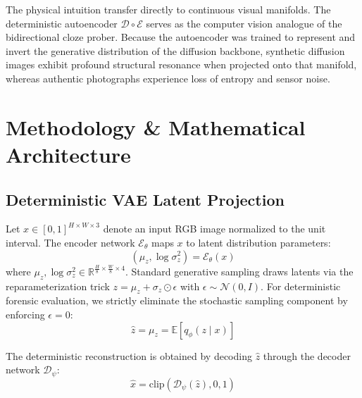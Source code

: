 \documentclass[conference]{IEEEtran}
\theoremstyle{definition}
\begin{document}
The physical intuition transfer directly to continuous visual manifolds. The deterministic autoencoder $\mathcal{D} \circ \mathcal{E}$ serves as the computer vision analogue of the bidirectional cloze prober. Because the autoencoder was trained to represent and invert the generative distribution of the diffusion backbone, synthetic diffusion images exhibit profound structural resonance when projected onto that manifold, whereas authentic photographs experience loss of entropy and sensor noise.

\section{Methodology \& Mathematical Architecture}

\subsection{Deterministic VAE Latent Projection}
Let $x \in [0, 1]^{H \times W \times 3}$ denote an input RGB image normalized to the unit interval. The encoder network $\mathcal{E}_\theta$ maps $x$ to latent distribution parameters:
\begin{equation}
(\mu_z, \log \sigma_z^2) = \mathcal{E}_\theta(x)
\end{equation}
where $\mu_z, \log \sigma_z^2 \in \mathbb{R}^{\frac{H}{8} \times \frac{W}{8} \times 4}$. Standard generative sampling draws latents via the reparameterization trick $z = \mu_z + \sigma_z \odot \epsilon$ with $\epsilon \sim \mathcal{N}(0, I)$. For deterministic forensic evaluation, we strictly eliminate the stochastic sampling component by enforcing $\epsilon = 0$:
\begin{equation}
\hat{z} = \mu_z = \mathbb{E}[q_\phi(z \mid x)]
\end{equation}

The deterministic reconstruction is obtained by decoding $\hat{z}$ through the decoder network $\mathcal{D}_\psi$:
\begin{equation}
\hat{x} = \text{clip}\left(\mathcal{D}_\psi(\hat{z}), 0, 1\right)
\end{equation}
\end{document}

